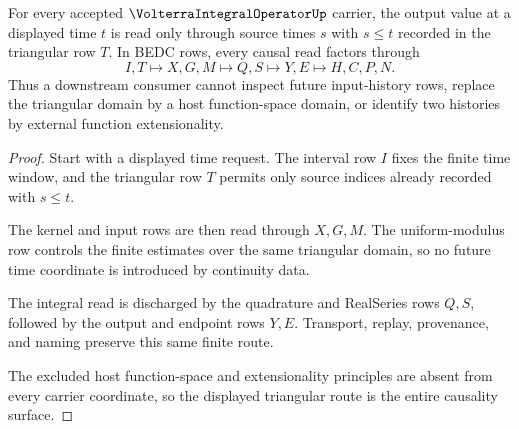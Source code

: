 \begin{theorem}
\label{thm:volterra-integral-operator-triangular-causality}
For every accepted $\VolterraIntegralOperatorUp$ carrier, the output value at a displayed time $t$ is read only through source times $s$ with $s\leq t$ recorded in the triangular row $T$. In BEDC rows, every causal read factors through
$$
I,T \longmapsto X,G,M \longmapsto Q,S \longmapsto Y,E \longmapsto H,C,P,N .
$$
Thus a downstream consumer cannot inspect future input-history rows, replace the triangular domain by a host function-space domain, or identify two histories by external function extensionality.
\end{theorem}
\begin{proof}
Start with a displayed time request. The interval row $I$ fixes the finite time window, and the triangular row $T$ permits only source indices already recorded with $s\leq t$.

The kernel and input rows are then read through $X,G,M$. The uniform-modulus row controls the finite estimates over the same triangular domain, so no future time coordinate is introduced by continuity data.

The integral read is discharged by the quadrature and RealSeries rows $Q,S$, followed by the output and endpoint rows $Y,E$. Transport, replay, provenance, and naming preserve this same finite route.

The excluded host function-space and extensionality principles are absent from every carrier coordinate, so the displayed triangular route is the entire causality surface.
\end{proof}

